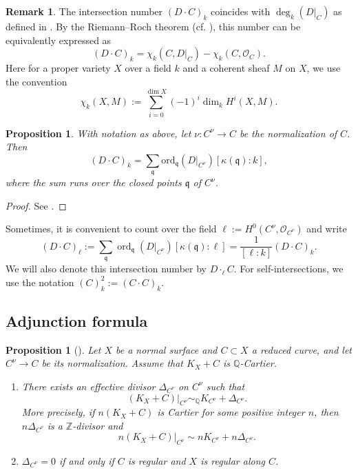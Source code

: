 \documentclass[reqno,oneside]{amsart}
\newtheorem{proposition}[theorem]{Proposition}
\theoremstyle{definition}
\newtheorem{remark}[theorem]{Remark}
\theoremstyle{plain}
\numberwithin{equation}{section}
\begin{document}
\begin{remark} 
  The intersection number $(D\cdot C)_k$ coincides with $\deg_k (D|_{C})$ as defined in \cite[Definition~7.3.1]{Liu-AGAC}.
  By the Riemann--Roch theorem (cf. \cite[Theorem~7.3.17]{Liu-AGAC}), this number can be equivalently expressed as 
  \[
    (D\cdot C)_k = \chi_k (C, D|_C) - \chi_k(C,\mathcal{O}_C).
  \]
  Here for a proper variety $X$ over a field $k$ and a coherent sheaf $M$ on $X$, we use the convention
  $$\chi_k(X,M) := \sum_{i=0}^{\dim X} (-1)^i\dim_k H^i(X,M).$$
\end{remark}

\begin{proposition}
  With notation as above, let $\nu\colon C^\nu\to C$ be the normalization of $C$.
  Then 
    \[
      (D\cdot C)_k = \sum_{\mathfrak q} \mathrm{ord}_{\mathfrak q} (D|_{C^\nu}) [\kappa(\mathfrak q):k] ,
    \]
     where the sum runs over the closed points $\mathfrak q$ of $C^\nu$.
\end{proposition}
\begin{proof}
  See \cite[Example~1.2.3]{fulton_intersection_theory}.
\end{proof}

Sometimes, it is convenient to count over the field $\ell := H^0(C^\nu,\mathcal{O}_{C^\nu})$ and write 
  \[
    (D\cdot C)_\ell := \sum_{\mathfrak q}\operatorname{ord}_{\mathfrak q}(D|_{C^\nu})[\kappa(\mathfrak q):\ell] = \frac{1}{[\ell:k]} (D\cdot C)_k.
  \]
We will also denote this intersection number by $D\cdot_\ell C$.
For self-intersections, we use the notation $(C)^2_k := (C\cdot C)_k$.


\subsection{Adjunction formula}\label{subsection-adjunction}
\begin{proposition}[{\cite[Proposition~2.35]{Kollar-Sing}}]\label{proposition-adj}
  Let $X$ be a normal surface and $C\subset X$ a reduced curve, and let $C^\nu\to C$ be its normalization.
  Assume that $K_X + C$ is $\mathbb Q$-Cartier.
  \begin{enumerate}[\rm(1)]
    \item There exists an effective divisor $\Delta_{C^\nu}$ on $C^\nu$ such that \[
        (K_X + C)|_{C^\nu} \sim_{\mathbb{Q}} K_{C^\nu} + \Delta_{C^\nu}.
      \]
      More precisely, if $n(K_X + C)$ is Cartier for some positive integer $n$, then $n\Delta_{C^\nu}$ is a $\mathbb Z$-divisor and \[
        n(K_X + C)|_{C^\nu} \sim nK_{C^\nu} + n\Delta_{C^\nu}.
      \]
    \item $\Delta_{C^\nu} = 0$ if and only if $C$ is regular and $X$ is regular along $C$.
  \end{enumerate}
\end{proposition}
\end{document}
